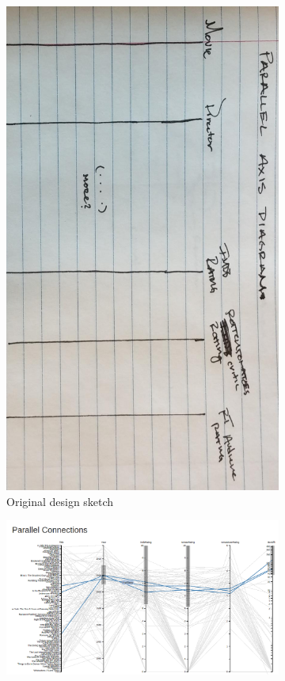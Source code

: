\documentclass[12pt]{article}
\begin{document}
	\begin{figure}[h!]
		\centering
		\begin{subfigure}[t]{.5\textwidth}
			  \centering
			  \includegraphics[width=\linewidth]{images/parallel_crop.jpg}
			  \caption{Original design sketch}
			  \label{fig:sub1}
		\end{subfigure}%
		\begin{subfigure}[t]{.6\textwidth}
			  \centering
			  \includegraphics[scale=.2]{images/parallelAxisCoordVis.png}

\end{subfigure}
\end{figure}
\end{document}
